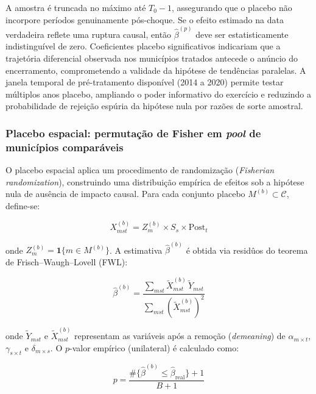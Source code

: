 \documentclass[12pt,a4paper]{article}
\begin{document}
A amostra \'e truncada no m\'aximo at\'e $T_0 - 1$, assegurando que o placebo n\~ao incorpore per\'iodos genuinamente p\'os-choque. Se o efeito estimado na data verdadeira reflete uma ruptura causal, ent\~ao $\hat{\beta}^{(p)}$ deve ser estatisticamente indistingu\'ivel de zero. Coeficientes placebo significativos indicariam que a trajet\'oria diferencial observada nos munic\'ipios tratados antecede o an\'uncio do encerramento, comprometendo a validade da hip\'otese de tend\^encias paralelas. A janela temporal de pr\'e-tratamento dispon\'ivel (2014 a 2020) permite testar m\'ultiplos anos placebo, ampliando o poder informativo do exerc\'icio e reduzindo a probabilidade de rejei\c{c}\~ao esp\'uria da hip\'otese nula por raz\~oes de sorte amostral.

\subsubsection{Placebo espacial: permuta\c{c}\~ao de Fisher em \textit{pool} de munic\'ipios compar\'aveis}
\label{sub:placebo_espacial}

O placebo espacial aplica um procedimento de randomiza\c{c}\~ao (\textit{Fisherian randomization}), construindo uma distribui\c{c}\~ao emp\'irica de efeitos sob a hip\'otese nula de aus\^encia de impacto causal. Para cada conjunto placebo $M^{(b)} \subset \mathcal{C}$, define-se:

\begin{equation}
X_{mst}^{(b)} = Z_m^{(b)} \times S_s \times \text{Post}_t
\label{eq:placebo_espacial}
\end{equation}

\noindent onde $Z_m^{(b)} = \mathbf{1}\{m \in M^{(b)}\}$. A estimativa $\hat{\beta}^{(b)}$ \'e obtida via resid\^uos do teorema de Frisch--Waugh--Lovell (FWL):

\begin{equation}
\hat{\beta}^{(b)} = \frac{\sum_{mst} \tilde{X}_{mst}^{(b)}\, \tilde{Y}_{mst}}
                        {\sum_{mst} \left(\tilde{X}_{mst}^{(b)}\right)^2}
\label{eq:fwl}
\end{equation}

\noindent onde $\tilde{Y}_{mst}$ e $\tilde{X}_{mst}^{(b)}$ representam as vari\'aveis ap\'os a remo\c{c}\~ao (\textit{demeaning}) de $\alpha_{m \times t}$, $\gamma_{s \times t}$ e $\delta_{m \times s}$. O $p$-valor emp\'irico (unilateral) \'e calculado como:

\begin{equation}
p = \frac{\#\{\hat{\beta}^{(b)} \leq \hat{\beta}_{\text{real}}\} + 1}{B + 1}
\label{eq:pvalue}
\end{equation}
\end{document}
